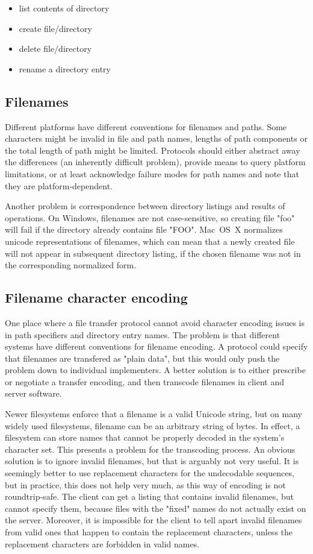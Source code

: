 \begin{itemize}
	\item list contents of directory
	\item create file/directory
	\item delete file/directory
	\item rename a directory entry
\end{itemize}

\subsection{Filenames}

Different platforms have different conventions for filenames and paths. Some characters might be invalid in
file and path names, lengths of path components or the total length of path might be limited. Protocols should
either abstract away the differences (an inherently difficult problem), provide means to query platform
limitations, or at least acknowledge failure modes for path names and note that they are platform-dependent.

Another problem is correspondence between directory listings and results of operations. On Windows, filenames
are not case-sensitive, so creating file "foo" will fail if the directory already contains file "FOO".
Mac~OS~X normalizes unicode representations of filenames, which can mean that a newly created file will not
appear in subsequent directory listing, if the chosen filename was not in the corresponding normalized form.

\subsection{Filename character encoding}

One place where a file transfer protocol cannot avoid character encoding issues is in path specifiers and
directory entry names. The problem is that different systems have different conventions for filename encoding.
A protocol could specify that filenames are transfered as "plain data", but this would only push the problem
down to individual implementers. A better solution is to either prescribe or negotiate a transfer encoding,
and then transcode filenames in client and server software.

Newer filesystems enforce that a filename is a valid Unicode string, but on many widely used filesystems,
filename can be an arbitrary string of bytes\footnotemark[3]. In effect, a filesystem can store names that
cannot be properly decoded in the system's character set. This presents a problem for the transcoding process.
An obvious solution is to ignore invalid filenames, but that is arguably not very useful. It is seemingly
better to use replacement characters for the undecodable sequences, but in practice, this does not help very
much, as this way of encoding is not roundtrip-safe. The client can get a listing that contains invalid
filenames, but cannot specify them, because files with the "fixed" names do not actually exist on the server.
Moreover, it is impossible for the client to tell apart invalid filenames from valid ones that happen to
contain the replacement characters, unless the replacement characters are forbidden in valid names.

